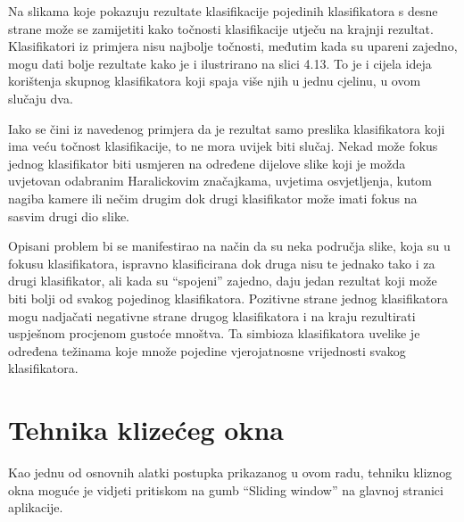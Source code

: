 \documentclass[times, utf8, zavrsni]{fer}
\begin{document}
\newpage

Na slikama koje pokazuju rezultate klasifikacije pojedinih klasifikatora s 
desne strane može se zamijetiti kako točnosti klasifikacije utječu na
krajnji rezultat. Klasifikatori iz primjera nisu najbolje točnosti, 
međutim kada su upareni zajedno, mogu dati bolje rezultate kako je 
i ilustrirano na slici 4.13. To je i cijela ideja korištenja skupnog
klasifikatora koji spaja više njih u jednu cjelinu, u ovom slučaju
dva. 

\bigbreak

Iako se čini iz navedenog primjera da je rezultat samo preslika 
klasifikatora koji ima veću točnost klasifikacije, to ne mora uvijek 
biti slučaj. Nekad može fokus jednog klasifikator biti usmjeren 
na određene dijelove slike koji je možda uvjetovan odabranim 
Haralickovim značajkama, uvjetima osvjetljenja, kutom nagiba kamere ili 
nečim drugim dok drugi klasifikator može imati fokus na sasvim drugi 
dio slike. 

\bigbreak

Opisani problem bi se manifestirao na način da su neka 
područja slike, koja su u fokusu klasifikatora, ispravno klasificirana 
dok druga nisu te jednako tako i za drugi klasifikator, ali kada
su \enquote{spojeni} zajedno, daju jedan rezultat koji može biti bolji od 
svakog pojedinog klasifikatora. Pozitivne strane jednog klasifikatora mogu nadjačati 
negativne strane drugog klasifikatora i na kraju rezultirati uspješnom
procjenom gustoće mnoštva. Ta simbioza klasifikatora uvelike je određena 
težinama koje množe pojedine vjerojatnosne vrijednosti svakog klasifikatora.


\chapter{Tehnika klizećeg okna}

Kao jednu od osnovnih alatki postupka prikazanog u ovom radu, tehniku
kliznog okna moguće je vidjeti pritiskom na gumb \enquote{Sliding window}
na glavnoj stranici aplikacije. 

\bigbreak
\end{document}
